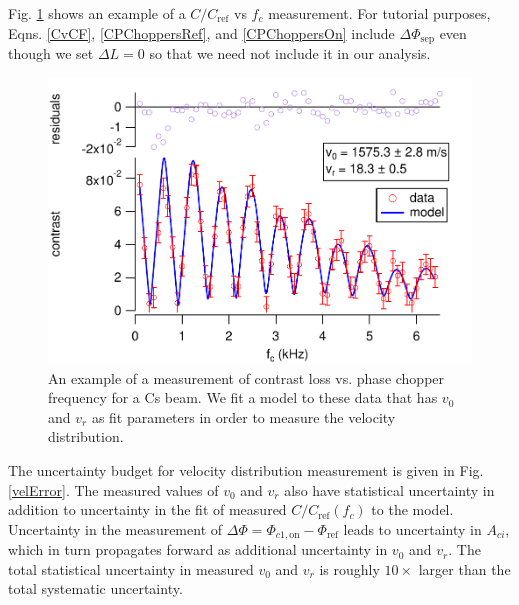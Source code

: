 \documentclass[twocolumn,prl,showpacs,superscriptaddress]{revtex4-1}   %
\newcommand{\figref}[1]{Fig. \ref{#1}}
\newcommand{\dphisep}{\Delta\Phi_{\mathrm{sep}}}
\begin{document}
\figref{CvCFExample} shows an example of a $C/C_{\mathrm{ref}}$ vs $f_c$ measurement. 
For tutorial purposes, Eqns. \eqref{CvCF}, \eqref{CPChoppersRef}, and \eqref{CPChoppersOn} include $\dphisep$ even though we set $\Delta L = 0$ so that we need not include it in our analysis.

\begin{figure}
\includegraphics[width=\linewidth,keepaspectratio]{CvCF_150420_o.pdf}
\caption{\label{CvCFExample}An example of a measurement of contrast loss vs. phase chopper frequency for a Cs beam. We fit a model to these data that has $v_0$ and $v_r$ as fit parameters in order to measure the velocity distribution.}
\end{figure}

The uncertainty budget for velocity distribution measurement is given in \figref{velError}. The measured values of $v_0$ and $v_r$ also have statistical uncertainty in addition to uncertainty in the fit of measured $C/C_{\mathrm{ref}}(f_c)$ to the model. Uncertainty in the measurement of $\Delta\Phi = \Phi_{c1,\mathrm{on}} - \Phi_{\mathrm{ref}}$ leads to uncertainty in $A_{ci}$, which in turn propagates forward as additional uncertainty in $v_0$ and $v_r$. The total statistical uncertainty in measured $v_0$ and $v_r$ is roughly $10\times$ larger than the total systematic uncertainty.
\end{document}
